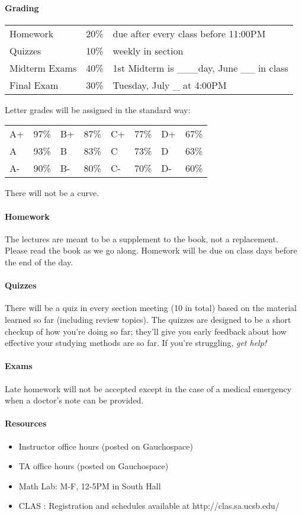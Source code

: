 \documentclass[a4paper,12pt]{article}
\begin{document}
\paragraph{Grading}
\begin{center}
\begin{tabular}{lll}
Homework       & 20\% & due after every class before 11:00PM \\
Quizzes        & 10\% & weekly in section  \\ 
Midterm Exams & 40\% & 1st Midterm is \_\_\_day, June \_\_ in class \\
Final Exam  & 30\% & Tuesday, July \_ at 4:00PM
\end{tabular}
\end{center}
Letter grades will be assigned in the standard way:
\begin{center}
\begin{tabular}{llllllll}
A+       & 97\% \qquad \phantom{.}	& B+       & 87\% \qquad \phantom{.}	& C+      & 77\% \qquad \phantom{.} 	& D+       & 67\% \\
A        & 93\%  	& B        & 83\% 	& C        & 73\% 	& D       & 63\%\\ 
A-       & 90\%  	& B-       & 80\% 	& C-       & 70\% 	& D-       & 60\% \\
\end{tabular}
\end{center}
There will not be a curve.


\paragraph{Homework}
 The lectures are meant to be a supplement to the book, not a replacement. Please read the book as we go along. Homework will be due on class days before the end of the day. 
 
 \paragraph{Quizzes} 
 There will be a quiz in every section meeting (10 in total) based on the material learned so far (including review topics). The quizzes are designed to be a short checkup of how you're doing so far; they'll give you early feedback about how effective your studying methods are so far. If you're struggling, \textit{get help!}
 
 \paragraph{Exams} 
 Late homework will not be accepted except in the case of a medical emergency when a doctor's note can be provided. 




\paragraph{Resources}
\begin{itemize}
\item Instructor office hours (posted on Gauchospace)
\item TA office hours (posted on Gauchospace)
\item Math Lab: M-F, 12-5PM in South Hall
\item CLAS : Registration and schedules available at http://clas.sa.ucsb.edu/
\end{itemize} 
\end{document}

